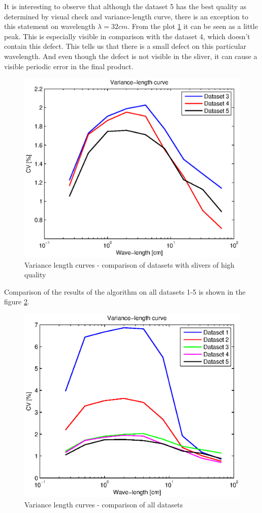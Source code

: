 \documentclass[twoside]{ctuthesis}
\theoremstyle{plain}
\theoremstyle{definition}
\theoremstyle{note}
\begin{document}
It is interesting to observe that although the dataset 5 has the best quality as determined by visual check and variance-length curve, there is an exception to this statement on wavelength $\lambda=32cm$. From the plot \ref{fig:VLC_3_4_5} it can be seen as a little peak. This is especially visible in comparison with the dataset 4, which doesn't contain this defect. This tells us that there is a small defect on this particular wavelength. And even though the defect is not visible in the sliver, it can cause a visible periodic error in the final product.
\begin{figure}[h]
	\centering
	\includegraphics[width=1.0\textwidth]{VLC_curves_3_4_5.eps}
	\caption{Variance length curves - comparison of datasets with slivers of high quality}
	\label{fig:VLC_3_4_5}
\end{figure}

Comparison of the results of the algorithm on all datasets 1-5 is shown in the figure \ref{fig:VLC_all}.
\begin{figure}[h]
	\centering
	\includegraphics[width=1.0\textwidth]{VLC_allCurves.eps}
	\caption{Variance length curves - comparison of all datasets}
	\label{fig:VLC_all}
\end{figure}
\end{document}
